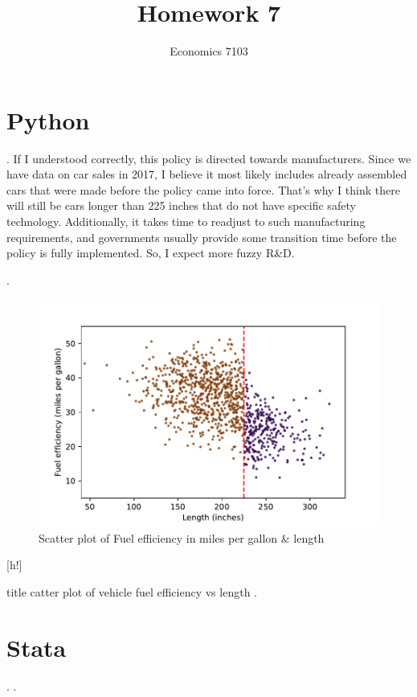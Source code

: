 \documentclass{article}
\title{Homework 7}
\author{Economics 7103}
\begin{document}
  
\maketitle

\section{Python}
. If I understood correctly, this policy is directed towards manufacturers. Since we have data on car sales in 2017, I believe it most likely includes already assembled cars that were made before the policy came into force. That's why I think there will still be cars longer than 225 inches that do not have specific safety technology. Additionally, it takes time to readjust to such manufacturing requirements, and governments usually provide some transition time before the policy is fully implemented. So, I expect more fuzzy R\&D.


.

\begin{figure}[h!]
    \centering
    \includegraphics{homework 7/output/figure/scatterplot1.pdf}
    \caption{Scatter plot of Fuel efficiency in miles per gallon \& length}
    \label{fig:scatterplot1}
\end{figure}[h!]

\clearpage


title catter plot of vehicle fuel efficiency vs length
. 

\section{Stata}

.
. 
\end{document}
